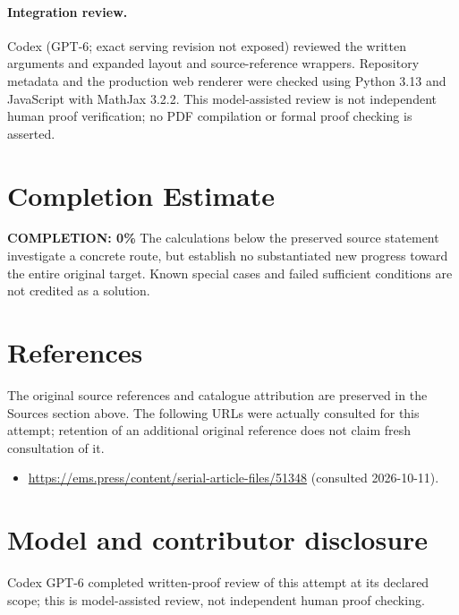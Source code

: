 \documentclass[11pt]{article}
\begin{document}
\paragraph{Integration review.} Codex (GPT-6; exact serving revision not exposed) reviewed the written arguments and expanded layout and source-reference wrappers. Repository metadata and the production web renderer were checked using Python 3.13 and JavaScript with MathJax 3.2.2. This model-assisted review is not independent human proof verification; no PDF compilation or formal proof checking is asserted.

\section{Completion Estimate}
\noindent\textbf{COMPLETION: 0\%}
The calculations below the preserved source statement investigate a concrete route,
but establish no substantiated new progress toward the entire original target.
Known special cases and failed sufficient conditions are not credited as a solution.
\section{References}
The original source references and catalogue attribution are preserved in the
Sources section above. The following URLs were actually consulted for this attempt;
retention of an additional original reference does not claim fresh consultation of it.
\begin{itemize}
\item \url{https://ems.press/content/serial-article-files/51348} (consulted 2026-10-11). 
\end{itemize}
\section{Model and contributor disclosure}
Codex GPT-6 completed written-proof review of this attempt at its declared scope; this is model-assisted review, not independent human proof checking.
\end{document}

